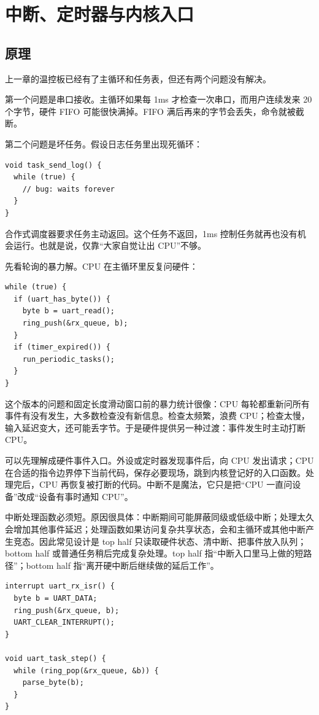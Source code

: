 \chapter{中断、定时器与内核入口}

\section{原理}

上一章的温控板已经有了主循环和任务表，但还有两个问题没有解决。

第一个问题是串口接收。主循环如果每 1ms 才检查一次串口，而用户连续发来 20 个字节，硬件 FIFO 可能很快满掉。FIFO 满后再来的字节会丢失，命令就被截断。

第二个问题是坏任务。假设日志任务里出现死循环：

\begin{lstlisting}
void task_send_log() {
  while (true) {
    // bug: waits forever
  }
}
\end{lstlisting}

合作式调度器要求任务主动返回。这个任务不返回，1ms 控制任务就再也没有机会运行。也就是说，仅靠“大家自觉让出 CPU”不够。

先看轮询的暴力解。CPU 在主循环里反复问硬件：

\begin{lstlisting}
while (true) {
  if (uart_has_byte()) {
    byte b = uart_read();
    ring_push(&rx_queue, b);
  }
  if (timer_expired()) {
    run_periodic_tasks();
  }
}
\end{lstlisting}

这个版本的问题和固定长度滑动窗口前的暴力统计很像：CPU 每轮都重新问所有事件有没有发生，大多数检查没有新信息。检查太频繁，浪费 CPU；检查太慢，输入延迟变大，还可能丢字节。于是硬件提供另一种过渡：事件发生时主动打断 CPU。

 可以先理解成硬件事件入口。外设或定时器发现事件后，向 CPU 发出请求；CPU 在合适的指令边界停下当前代码，保存必要现场，跳到内核登记好的入口函数。处理完后，CPU 再恢复被打断的代码。中断不是魔法，它只是把“CPU 一直问设备”改成“设备有事时通知 CPU”。

中断处理函数必须短。原因很具体：中断期间可能屏蔽同级或低级中断；处理太久会增加其他事件延迟；处理函数如果访问复杂共享状态，会和主循环或其他中断产生竞态。因此常见设计是 top half 只读取硬件状态、清中断、把事件放入队列；bottom half 或普通任务稍后完成复杂处理。top half 指“中断入口里马上做的短路径”；bottom half 指“离开硬中断后继续做的延后工作”。

\begin{lstlisting}
interrupt uart_rx_isr() {
  byte b = UART_DATA;
  ring_push(&rx_queue, b);
  UART_CLEAR_INTERRUPT();
}

void uart_task_step() {
  while (ring_pop(&rx_queue, &b)) {
    parse_byte(b);
  }
}
\end{lstlisting}

